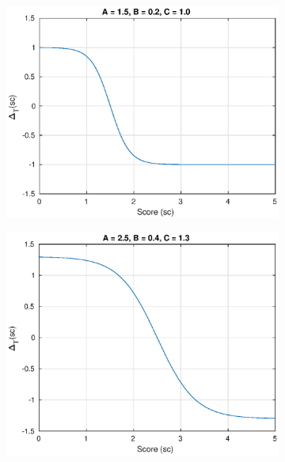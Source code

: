 \begin{figure}[!htbp]
  \begin{subfigure}[b]{0.5\textwidth}
    \includegraphics[width=\textwidth, height= 0.26\textheight]{figures/sigmoid1.eps}
    \label{fig:sigmoid1}
  \end{subfigure}
  \hfill
  \begin{subfigure}[b]{0.5\textwidth}
    \includegraphics[width=\textwidth, height=0.26\textheight]{figures/sigmoid3.eps}
    \label{fig:sigmoid2}
  \end{subfigure}\\
  \begin{subfigure}[b]{0.5\textwidth}

\end{subfigure}
\end{figure}
